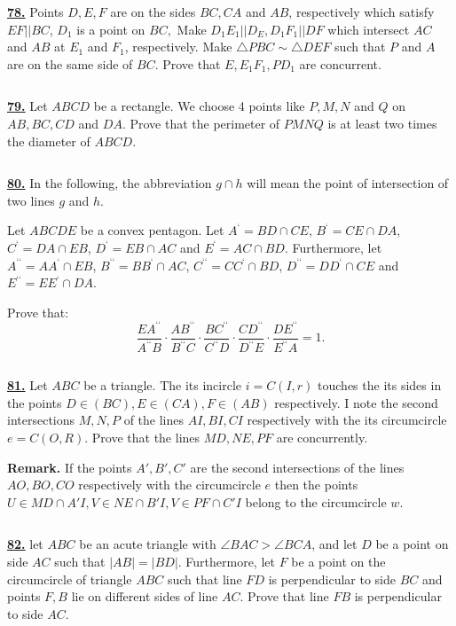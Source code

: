 \documentclass{article}
\begin{document}
\href{http://www.artofproblemsolving.com/Forum/viewtopic.php?p=347236#p347236
 }{\bf 78.} Points $D,E,F$ are on the sides $BC, CA$ and $AB$, respectively which satisfy $EF || BC$, $D_1$ is a point on $BC,$ Make $D_1E_1 || D_E, D_1F_1 || DF$ which intersect $AC$ and $AB$ at $E_1$ and $F_1$, respectively. Make $\triangle PBC \sim \triangle DEF$ such that $P$ and $A$ are on the same side of $BC.$ Prove that $E, E_1F_1, PD_1$ are concurrent.


$$ $$

\href{ http://www.artofproblemsolving.com/Forum/viewtopic.php?p=364939#p364939}{\bf 79.} Let $ABCD$ be a rectangle. We choose 4 points like $P,M,N$ and $Q$ on $AB,BC,CD$ and $DA$. Prove that the perimeter of $PMNQ$ is at least two times the diameter of $ABCD$.

$$ $$


\href{ http://www.artofproblemsolving.com/Forum/viewtopic.php?p=363888#p363888
}{\bf 80.} In the following, the abbreviation $g \cap h$ will mean the point of intersection of two lines $g$ and $h$.

Let $ABCDE$ be a convex pentagon. Let $A^{}=BD\cap CE$, $B^{}=CE\cap DA$, $C^{}=DA\cap EB$, $D^{}=EB\cap AC$ and $E^{}=AC\cap BD$. Furthermore, let $A^{}=AA^{}\cap EB$, $B^{}=BB^{}\cap AC$, $C^{}=CC^{}\cap BD$, $D^{}=DD^{}\cap CE$ and $E^{}=EE^{}\cap DA$.

Prove that:
$$ \frac{EA^{}}{A^{}B}\cdot\frac{AB^{}}{B^{}C}\cdot\frac{BC^{}}{C^{}D}\cdot\frac{CD^{}}{D^{}E}\cdot\frac{DE^{}}{E^{}A}=1.  $$


$$ $$

\href{ http://www.artofproblemsolving.com/Forum/viewtopic.php?p=361066#p361066
}{\bf 81.}  Let $ABC$ be a triangle. The its incircle $i=C(I,r)$ touches the its sides in the points $D\in (BC),E\in (CA),F\in (AB)$ respectively. I note the second intersections $M,N,P$ of the lines $AI,BI,CI$ respectively with the its circumcircle $e=C(O,R)$. Prove that the lines $MD,NE,PF$ are concurrently.

{\bf Remark.}  If the points $A',B',C'$ are the second intersections of the lines $AO,BO,CO$ respectively with the circumcircle $e$ then the points $U\in MD\cap A'I,V\in NE\cap B'I,V\in PF\cap C'I$ belong to the circumcircle $w$.


$$ $$

\href{ http://www.artofproblemsolving.com/Forum/viewtopic.php?p=331636#p331636
}{\bf 82.} let $ABC$ be an acute triangle with $\angle BAC>\angle BCA$, and let $D$ be a point on side $AC$ such that
$|AB|=|BD|$. Furthermore, let $F$ be a point on the circumcircle of triangle $ABC$
such that line $FD$ is perpendicular to side $BC$ and points $F,B$ lie on different sides of line $AC$.
Prove that line $FB$ is perpendicular to side $AC.$
\end{document}
